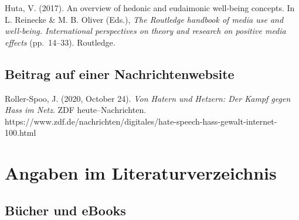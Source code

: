 \documentclass[
  letterpaper,
  DIV=11]{scrreprt}
\begin{document}
Huta, V. (2017). An overview of hedonic and eudaimonic well-being
concepts. In L. Reinecke \& M. B. Oliver (Eds.), \emph{The Routledge
handbook of media use and well-being. International perspectives on
theory and research on positive media effects} (pp.~14--33). Routledge.

\subsection{Beitrag auf einer
Nachrichtenwebsite}\label{beitrag-auf-einer-nachrichtenwebsite}

Roller-Spoo, J. (2020, October 24). \emph{Von Hatern und Hetzern: Der
Kampf gegen Hass im Netz}. ZDF heute--Nachrichten.
https://www.zdf.de/nachrichten/digitales/hate-speech-hass-gewalt-internet-100.html

\section{Angaben im
Literaturverzeichnis}\label{sec-angaben-im-literaturverzeichnis}

\subsection{Bücher und eBooks}\label{sec-buxfccher-und-ebooks}
\end{document}
